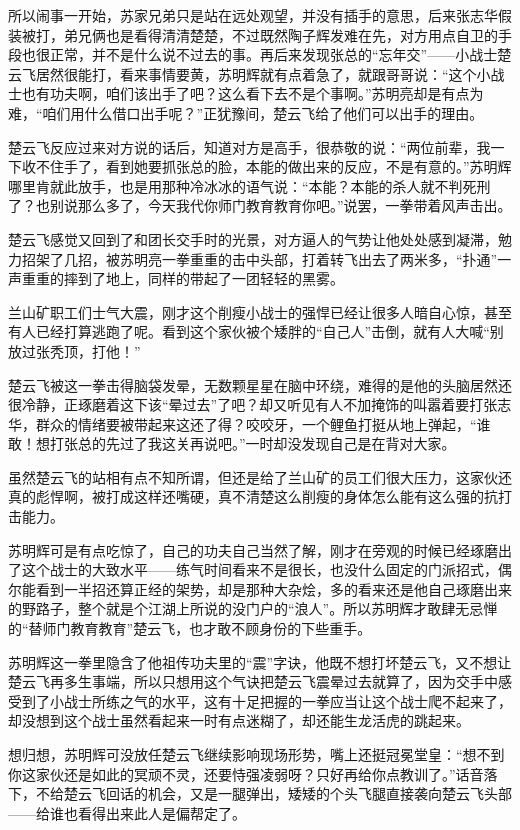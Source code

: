 所以闹事一开始，苏家兄弟只是站在远处观望，并没有插手的意思，后来张志华假装被打，弟兄俩也是看得清清楚楚，不过既然陶子辉发难在先，对方用点自卫的手段也很正常，并不是什么说不过去的事。再后来发现张总的“忘年交”——小战士楚云飞居然很能打，看来事情要黄，苏明辉就有点着急了，就跟哥哥说：“这个小战士也有功夫啊，咱们该出手了吧？这么看下去不是个事啊。”苏明亮却是有点为难，“咱们用什么借口出手呢？”正犹豫间，楚云飞给了他们可以出手的理由。

楚云飞反应过来对方说的话后，知道对方是高手，很恭敬的说：“两位前辈，我一下收不住手了，看到她要抓张总的脸，本能的做出来的反应，不是有意的。”苏明辉哪里肯就此放手，也是用那种冷冰冰的语气说：“本能？本能的杀人就不判死刑了？也别说那么多了，今天我代你师门教育教育你吧。”说罢，一拳带着风声击出。

楚云飞感觉又回到了和团长交手时的光景，对方逼人的气势让他处处感到凝滞，勉力招架了几招，被苏明亮一拳重重的击中头部，打着转飞出去了两米多，“扑通”一声重重的摔到了地上，同样的带起了一团轻轻的黑雾。

兰山矿职工们士气大震，刚才这个削瘦小战士的强悍已经让很多人暗自心惊，甚至有人已经打算逃跑了呢。看到这个家伙被个矮胖的“自己人”击倒，就有人大喊“别放过张秃顶，打他！”

楚云飞被这一拳击得脑袋发晕，无数颗星星在脑中环绕，难得的是他的头脑居然还很冷静，正琢磨着这下该“晕过去”了吧？却又听见有人不加掩饰的叫嚣着要打张志华，群众的情绪要被带起来这还了得？咬咬牙，一个鲤鱼打挺从地上弹起，“谁敢！想打张总的先过了我这关再说吧。”一时却没发现自己是在背对大家。

虽然楚云飞的站相有点不知所谓，但还是给了兰山矿的员工们很大压力，这家伙还真的彪悍啊，被打成这样还嘴硬，真不清楚这么削瘦的身体怎么能有这么强的抗打击能力。

苏明辉可是有点吃惊了，自己的功夫自己当然了解，刚才在旁观的时候已经琢磨出了这个战士的大致水平——练气时间看来不是很长，也没什么固定的门派招式，偶尔能看到一半招还算正经的架势，却是那种大杂烩，多的看来还是他自己琢磨出来的野路子，整个就是个江湖上所说的没门户的“浪人”。所以苏明辉才敢肆无忌惮的“替师门教育教育”楚云飞，也才敢不顾身份的下些重手。

苏明辉这一拳里隐含了他祖传功夫里的“震”字诀，他既不想打坏楚云飞，又不想让楚云飞再多生事端，所以只想用这个气诀把楚云飞震晕过去就算了，因为交手中感受到了小战士所练之气的水平，这有十足把握的一拳应当让这个战士爬不起来了，却没想到这个战士虽然看起来一时有点迷糊了，却还能生龙活虎的跳起来。

想归想，苏明辉可没放任楚云飞继续影响现场形势，嘴上还挺冠冕堂皇：“想不到你这家伙还是如此的冥顽不灵，还要恃强凌弱呀？只好再给你点教训了。”话音落下，不给楚云飞回话的机会，又是一腿弹出，矮矮的个头飞腿直接袭向楚云飞头部——给谁也看得出来此人是偏帮定了。

